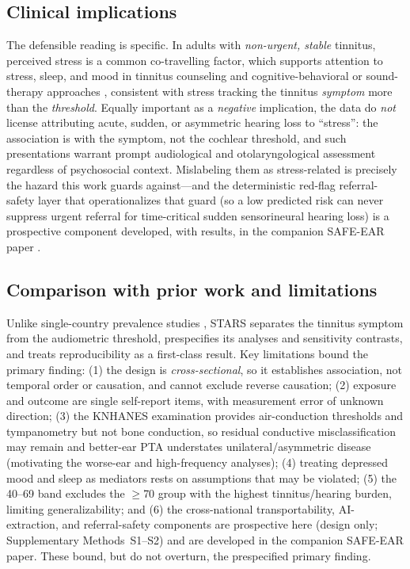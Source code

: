 \subsection{Clinical implications}
The defensible reading is specific. In adults with \emph{non-urgent, stable}
tinnitus, perceived stress is a common co-travelling factor, which supports
attention to stress, sleep, and mood in tinnitus counseling and
cognitive-behavioral or sound-therapy approaches \citep{tunkel2014cpg}, consistent
with stress tracking the tinnitus \emph{symptom} more than the \emph{threshold}.
Equally important as a \emph{negative} implication, the data do \emph{not} license
attributing acute, sudden, or asymmetric hearing loss to ``stress'': the
association is with the symptom, not the cochlear threshold, and such presentations
warrant prompt audiological and otolaryngological assessment regardless of
psychosocial context. Mislabeling them as stress-related is precisely the hazard
this work guards against---and the deterministic red-flag referral-safety layer
that operationalizes that guard (so a low predicted risk can never suppress urgent
referral for time-critical sudden sensorineural hearing loss) is a prospective
component developed, with results, in the companion SAFE-EAR paper
\citep{chandrasekhar2019ssnhl}.

\subsection{Comparison with prior work and limitations}
Unlike single-country prevalence studies \citep{park2014tinnitus,joo2015hrqol},
STARS separates the tinnitus symptom from the audiometric threshold, prespecifies
its analyses and sensitivity contrasts, and treats reproducibility as a
first-class result. Key limitations bound the primary finding: (1) the design is
\emph{cross-sectional}, so it establishes association, not temporal order or
causation, and cannot exclude reverse causation; (2) exposure and outcome are
single self-report items, with measurement error of unknown direction; (3) the KNHANES
examination provides air-conduction thresholds and tympanometry but not bone
conduction, so residual conductive misclassification may remain and better-ear PTA
understates unilateral/asymmetric disease (motivating the worse-ear and
high-frequency analyses); (4) treating depressed mood and sleep as mediators rests
on assumptions that may be violated; (5) the 40--69 band excludes the $\geq$70
group with the highest tinnitus/hearing burden, limiting generalizability; and (6)
the cross-national transportability, AI-extraction, and referral-safety components
are prospective here (design only; Supplementary Methods~S1--S2) and are developed
in the companion SAFE-EAR paper. These bound, but do not overturn, the prespecified
primary finding.
